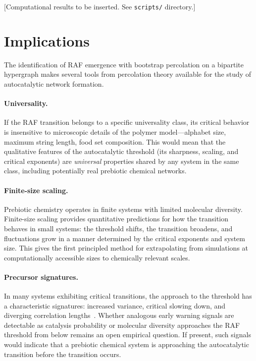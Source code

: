 \documentclass[preprint,12pt]{elsarticle}
\begin{document}
[Computational results to be inserted. See \texttt{scripts/} directory.]

\section{Implications}
\label{sec:implications}

The identification of RAF emergence with bootstrap percolation
on a bipartite hypergraph makes several tools from percolation
theory available for the study of autocatalytic network
formation.

\paragraph{Universality.}
If the RAF transition belongs to a specific universality class,
its critical behavior is insensitive to microscopic details of
the polymer model---alphabet size, maximum string length,
food set composition. This would mean that the qualitative
features of the autocatalytic threshold (its sharpness, scaling,
and critical exponents) are \emph{universal} properties shared
by any system in the same class, including potentially
real prebiotic chemical networks.

\paragraph{Finite-size scaling.}
Prebiotic chemistry operates in finite systems with limited
molecular diversity. Finite-size scaling provides quantitative
predictions for how the transition behaves in small systems:
the threshold shifts, the transition broadens, and fluctuations
grow in a manner determined by the critical exponents and
system size. This gives the first principled method for
extrapolating from simulations at computationally accessible
sizes to chemically relevant scales.

\paragraph{Precursor signatures.}
In many systems exhibiting critical transitions, the approach
to the threshold has a characteristic
signatures: increased variance, critical slowing down, and
diverging correlation lengths~\cite{scheffer2009early,
bury2021deep}. Whether analogous early warning signals are
detectable as catalysis probability or molecular diversity
approaches the RAF threshold from below remains an open
empirical question. If present, such signals would
indicate that a prebiotic chemical system is approaching
the autocatalytic transition before the transition occurs.
\end{document}
